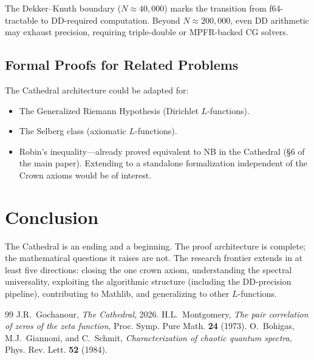 \documentclass[11pt,a4paper]{article}
\begin{document}
The Dekker--Knuth boundary ($N \approx 40{,}000$) marks the
transition from f64-tractable to DD-required computation. Beyond
$N \approx 200{,}000$, even DD arithmetic may exhaust precision,
requiring triple-double or MPFR-backed CG solvers.

\subsection{Formal Proofs for Related Problems}

The Cathedral architecture could be adapted for:
\begin{itemize}
  \item The Generalized Riemann Hypothesis (Dirichlet $L$-functions).
  \item The Selberg class (axiomatic $L$-functions).
  \item Robin's inequality---already proved equivalent to NB
    in the Cathedral (\S6 of the main paper). Extending to
    a standalone formalization independent of the Crown axioms
    would be of interest.
\end{itemize}

\section{Conclusion}

The Cathedral is an ending and a beginning. The proof architecture
is complete; the mathematical questions it raises are not. The
research frontier extends in at least five directions: closing the
one crown axiom, understanding the spectral universality, exploiting the
algorithmic structure (including the DD-precision pipeline),
contributing to Mathlib, and generalizing to other $L$-functions.

\begin{thebibliography}{99}
J.R.~Gochanour, \emph{The Cathedral}, 2026.
H.L.~Montgomery, \emph{The pair correlation of zeros of the zeta
function}, Proc. Symp. Pure Math. \textbf{24} (1973).
O.~Bohigas, M.J.~Giannoni, and C.~Schmit, \emph{Characterization
of chaotic quantum spectra}, Phys. Rev. Lett. \textbf{52} (1984).
\end{thebibliography}
\end{document}
